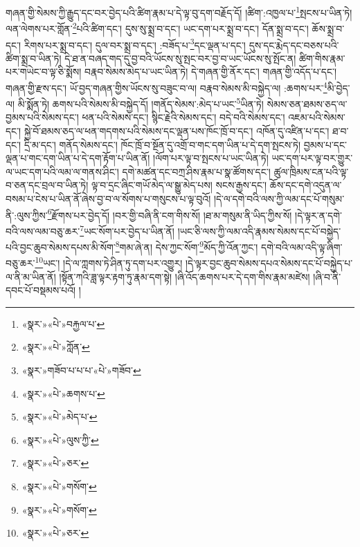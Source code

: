 གཞན་གྱི་སེམས་ཀྱི་རྒྱུད་དང་བར་བྱེད་པའི་ཚིག་རྣམ་པ་དེ་ལྟ་བུ་དག་བརྗོད་དོ། །ཚིག་:འཁྱལ་པ་\footnote{«སྣར་»«པེ་»བརྐྱལ་པ་}སྤངས་པ་ཡིན་ཏེ། ལན་ལེགས་པར་གློན་\footnote{«སྣར་»«པེ་»ཀློན་}པའི་ཚིག་དང་། དུས་སུ་སྨྲ་བ་དང་། ཡང་དག་པར་སྨྲ་བ་དང་། དོན་སྨྲ་བ་དང་། ཆོས་སྨྲ་བ་དང་། རིགས་པར་སྨྲ་བ་དང་། དུལ་བར་སྨྲ་བ་དང་། :བཟོད་པ་\footnote{«སྣར་»གཟོབ་པ་པ་པ་«པེ་»གཟོབ་}དང་ལྡན་པ་དང་། དུས་དང་རྨེད་དང་བཅས་པའི་ཚིག་སྨྲ་བ་ཡིན་ཏེ། དེ་ཐ་ན་བཞད་གད་དུ་བྱ་བའི་ཡོངས་སུ་སྤང་བར་བྱ་བ་ཡང་ཡོངས་སུ་སྤོང་ན། ཚིག་གིས་རྣམ་པར་གཡེང་བ་ལྟ་ཅི་སྨོས། བརྣབ་སེམས་མེད་པ་ཡང་ཡིན་ཏེ། དེ་གཞན་གྱི་ནོར་དང་། གཞན་གྱི་འདོད་པ་དང་། གཞན་གྱི་རྫས་དང་། ཡོ་བྱད་གཞན་གྱིས་ཡོངས་སུ་བཟུང་བ་ལ། བརྣབ་སེམས་མི་བསྐྱེད་ལ། :ཆགས་པར་\footnote{«སྣར་»«པེ་»ཆགས་པ་}མི་བྱེད་ལ། མི་སྨོན་ཏེ། ཆགས་པའི་སེམས་མི་བསྐྱེད་དོ། །གནོད་སེམས་:མེད་པ་ཡང་\footnote{«སྣར་»«པེ་»མེད་པ་}ཡིན་ཏེ། སེམས་ཅན་ཐམས་ཅད་ལ་བྱམས་པའི་སེམས་དང་། ཕན་པའི་སེམས་དང་། སྙིང་རྗེའི་སེམས་དང་། བདེ་བའི་སེམས་དང་། འཇམ་པའི་སེམས་དང་། སྐྱེ་བོ་ཐམས་ཅད་ལ་ཕན་གདགས་པའི་སེམས་དང་ལྡན་པས་ཁོང་ཁྲོ་བ་དང་། འཁོན་དུ་འཛིན་པ་དང་། ཐ་བ་དང་། དྲི་མ་དང་། གནོད་སེམས་དང་། ཁོང་ཁྲོ་བ་སྔོན་དུ་འགྲོ་བ་གང་དག་ཡིན་པ་དེ་དག་སྤངས་ཏེ། བྱམས་པ་དང་ལྡན་པ་གང་དག་ཡིན་པ་དེ་དག་རྟོག་པ་ཡིན་ནོ། །ལོག་པར་ལྟ་བ་སྤངས་པ་ཡང་ཡིན་ཏེ། ཡང་དག་པར་ལྟ་བར་གྱུར་ལ་ཡང་དག་པའི་ལམ་ལ་གནས་ཤིང་། དགེ་མཚན་དང་བཀྲ་ཤིས་རྣམ་པ་སྣ་ཚོགས་དང་། ཚུལ་ཁྲིམས་ངན་པའི་ལྟ་བ་ཅན་དང་བྲལ་བ་ཡིན་ཏེ། ལྟ་བ་དྲང་ཞིང་གཡོ་མེད་ལ་སྒྱུ་མེད་པས། སངས་རྒྱས་དང་། ཆོས་དང་དགེ་འདུན་ལ་བསམ་པ་ངེས་པ་ཡིན་ནོ་ཞེས་བྱ་བ་ལ་སོགས་པ་གསུངས་པ་ལྟ་བུའོ། །དེ་ལ་དགེ་བའི་ལས་ཀྱི་ལམ་དང་པོ་གསུམ་ནི་:ལུས་ཀྱིས་\footnote{«སྣར་»«པེ་»ལུས་ཀྱི་}རྫོགས་པར་བྱེད་དོ། །བར་གྱི་བཞི་ནི་ངག་གིས་སོ། །ཐ་མ་གསུམ་ནི་ཡིད་ཀྱིས་སོ། །དེ་ལྟར་ན་དགེ་བའི་ལས་ལམ་བཅུ་ཆར་\footnote{«སྣར་»«པེ་»ཅར་}ཡང་སོག་པར་བྱེད་པ་ཡིན་ནོ། །ཡང་ཅི་ལས་ཀྱི་ལམ་འདི་རྣམས་སེམས་དང་པོ་བསྐྱེད་པའི་བྱང་ཆུབ་སེམས་དཔས་མི་སོག་\footnote{«སྣར་»«པེ་»གསོག་}གམ་ཞེ་ན། དེས་ཀྱང་སོག་\footnote{«སྣར་»«པེ་»གསོག་}མོད་ཀྱི་འོན་ཀྱང་། དགེ་བའི་ལམ་འདི་ལྟ་ཞིག་བཅུ་ཆར་\footnote{«སྣར་»«པེ་»ཅར་}ཡང་། །དེ་ལ་ཀླགས་ཏེ་ཤིན་ཏུ་དག་པར་འགྱུར། །དེ་ལྟར་བྱང་ཆུབ་སེམས་དཔའ་སེམས་དང་པོ་བསྐྱེད་པ་ལ་ནི་མ་ཡིན་ནོ། །སྟོན་ཀའི་ཟླ་ལྟར་རྟག་ཏུ་རྣམ་དག་སྟེ། །ཞི་འོད་ཆགས་པར་དེ་དག་གིས་རྣམ་མཛེས། །ཞི་བ་ནི་དབང་པོ་བསྡམས་པའོ། །
